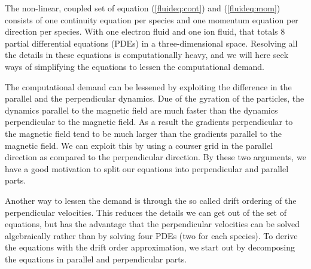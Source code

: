 The non-linear, coupled set of equation (\ref{fluideq:cont}) and (\ref{fluideq:mom}) consists of one continuity equation per species and one momentum equation per direction per species.
With one electron fluid and one ion fluid, that totals $8$ partial differential equations (PDEs) in a three-dimensional space.
Resolving all the details in these equations is computationally heavy, and we will here seek ways of simplifying the equations to lessen the computational demand.

The computational demand can be lessened by exploiting the difference in the parallel and the perpendicular dynamics.
Due of the gyration of the particles, the dynamics parallel to the magnetic field are much faster than the dynamics perpendicular to the magnetic field.
As a result the gradients perpendicular to the magnetic field tend to be much larger than the gradients parallel to the magnetic field.
We can exploit this by using a courser grid in the parallel direction as compared to the perpendicular direction.
By these two arguments, we have a good motivation to split our equations into perpendicular and parallel parts.

Another way to lessen the demand is through the so called drift ordering of the perpendicular velocities.
 This reduces the details we can get out of the set of equations, but has the advantage that the perpendicular velocities can be solved algebraically rather than by solving four PDEs (two for each species).
 To derive the equations with the drift order approximation, we start out by decomposing the equations in parallel and perpendicular parts.

